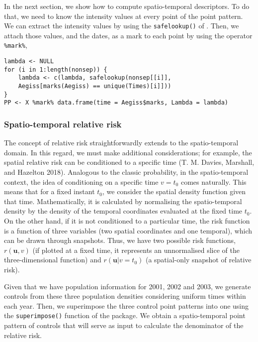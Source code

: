 In the next section, we show how to compute spatio-temporal descriptors. To do that, we need to know the intensity values at every point of the point pattern. We can extract the intensity values by using the \texttt{safelookup()} of . Then, we attach those values, and the dates, as a mark to each point by using the operator \texttt{\%mark\%},

\begin{verbatim}
lambda <- NULL
for (i in 1:length(nonsep)) {
    lambda <- c(lambda, safelookup(nonsep[[i]], 
    Aegiss[marks(Aegiss) == unique(Times)[i]]))
}
PP <- X %mark% data.frame(time = Aegiss$marks, Lambda = lambda)
\end{verbatim}

\hypertarget{spatio-temporal-relative-risk}{%
\subsubsection{Spatio-temporal relative risk}\label{spatio-temporal-relative-risk}}

The concept of relative risk straightforwardly extends to the spatio-temporal domain. In this regard, we must make additional considerations; for example, the spatial relative risk can be conditioned to a specific time (T. M. Davies, Marshall, and Hazelton 2018). Analogous to the classic probability, in the spatio-temporal context, the idea of conditioning on a specific time \(v=t_0\) comes naturally. This means that for a fixed instant \(t_0\), we consider the spatial density function given that time. Mathematically, it is calculated by normalising the spatio-temporal density by the density of the temporal coordinates evaluated at the fixed time \(t_0\). On the other hand, if it is not conditioned to a particular time, the risk function is a function of three variables (two spatial coordinates and one temporal), which can be drawn through snapshots. Thus, we have two possible risk functions, \(r(\mathbf{u},v)\) (if plotted at a fixed time, it represents an unnormalised slice of the three-dimensional function) and \(r(\mathbf{u}|v=t_0)\) (a spatial-only snapshot of relative risk).

Given that we have population information for 2001, 2002 and 2003, we generate controls from these three population densities considering uniform times within each year. Then, we superimpose the three control point patterns into one using the \texttt{superimpose()} function of the  package. We obtain a spatio-temporal point pattern of controls that will serve as input to calculate the denominator of the relative risk.

